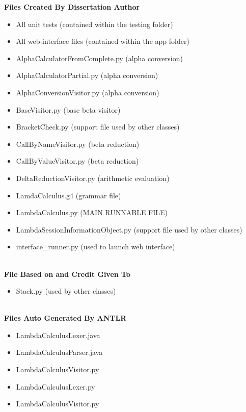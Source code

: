 \documentclass[a4paper,11pt]{report}
\begin{document}
\textbf{Files Created By Dissertation Author}
\begin{itemize}
	\item All unit tests (contained within the testing folder)
	\item All web-interface files (contained within the app folder)
	\item AlphaCalculatorFromComplete.py (alpha conversion)  
	\item AlphaCalculatorPartial.py (alpha conversion)  
	\item AlphaConversionVisitor.py (alpha conversion)  
	\item BaseVisitor.py (base beta visitor)  
	\item BracketCheck.py (support file used by other classes)  
	\item CallByNameVisitor.py (beta reduction)  
	\item CallByValueVisitor.py (beta reduction)  
	\item DeltaReductionVisitor.py (arithmetic evaluation)  
	\item LamdaCalculus.g4 (grammar file)  
	\item LambdaCalculus.py (MAIN RUNNABLE FILE)  
	\item LambdaSessionInformationObject.py (support file used by other classes)  
	\item interface_runner.py (used to launch web interface)  
\end{itemize}
\  \\
\textbf{File Based on and Credit Given To \cite{Stack}}
\begin{itemize}
	\item Stack.py (used by other classes) 
\end{itemize}
\  \\
\textbf{Files Auto Generated By ANTLR}
\begin{itemize}
	\item LambdaCalculusLexer.java  
	\item LambdaCalculusParser.java  
	\item LambdaCalculusVisitor.py  
	\item LambdaCalculusLexer.py  
	\item LambdaCalculusVisitor.py  
\end{itemize}
\newpage
\end{document}
